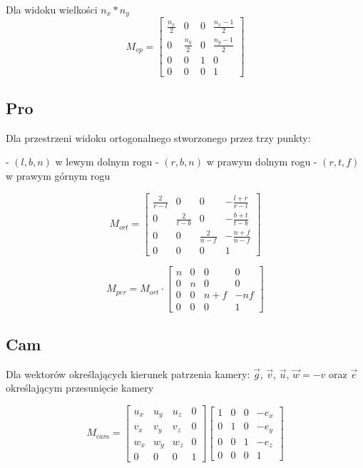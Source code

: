 \documentclass{../notatki}
\begin{document}
Dla widoku wielkości $n_x * n_y$
$$
M_{vp} = \begin{bmatrix} 
    \frac{n_x}{2} & 0 & 0 & \frac{n_x - 1}{2} \\
    0 & \frac{n_y}{2} & 0 & \frac{n_y - 1}{2} \\
    0 & 0 & 1 & 0 \\
    0 & 0 & 0 & 1 
\end{bmatrix}
$$

\subsection{Pro}

Dla przestrzeni widoku ortogonalnego stworzonego przez trzy punkty:

- $(l,b,n)$ w lewym dolnym rogu
- $(r,b,n)$ w prawym dolnym rogu
- $(r,t,f)$ w prawym górnym rogu

$$
M_{ort} = \begin{bmatrix} 
    \frac{2}{r - l} & 0 & 0 & -\frac{l + r}{r - l} \\
    0 & \frac{2}{t - b} & 0 & -\frac{b + t}{t - b} \\
    0 & 0 & \frac{2}{n - f} & -\frac{n + f}{n - f} \\
    0 & 0 & 0 & 1 
\end{bmatrix}
$$

$$
M_{per} = M_{ort} \cdot \begin{bmatrix} 
    n & 0 & 0 & 0 \\
    0 & n & 0 & 0 \\
    0 & 0 & n + f & -nf \\
    0 & 0 & 0 & 1 
\end{bmatrix}
$$

\subsection{Cam}

Dla wektorów określających kierunek patrzenia kamery: $\vec{g}$, $\vec{v}$, $\vec{u}$, $\vec{w} = -v$ oraz $\vec{e}$ określającym przesunięcie kamery

$$
M_{cam} = \begin{bmatrix} 
    u_x & u_y & u_z & 0 \\
    v_x & v_y & v_z & 0 \\
    w_x & w_y & w_z & 0 \\
    0 & 0 & 0 & 1 
\end{bmatrix}
\begin{bmatrix}
    1 & 0 & 0 & -e_x \\
    0 & 1 & 0 & -e_y \\
    0 & 0 & 1 & -e_z \\
    0 & 0 & 0 & 1 
\end{bmatrix}
$$
\end{document}
